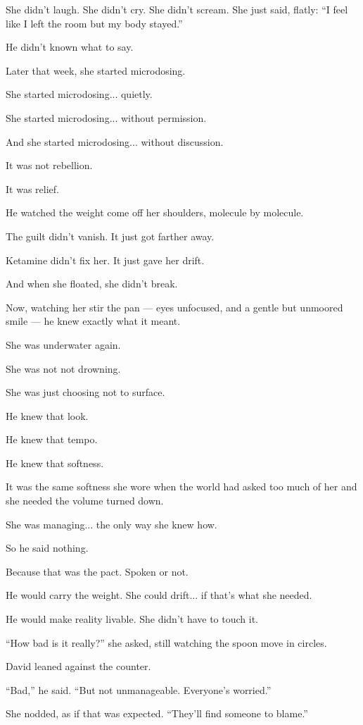 She didn't laugh. She didn’t cry. She didn’t scream. She just said, flatly:
``I feel like I left the room but my body stayed.''

He didn't known what to say.

Later that week, she started microdosing. 

She started microdosing... quietly. 

She started microdosing... without permission.

And she started microdosing... without discussion. 

It was not rebellion.

It was relief.

He watched the weight come off her shoulders, molecule by molecule.

The guilt didn’t vanish. It just got farther away.

Ketamine didn’t fix her. It just gave her drift.

And when she floated, she didn’t break.

Now, watching her stir the pan --- eyes unfocused, and a gentle but unmoored smile --- he knew exactly 
what it meant.

She was underwater again.

She was not not drowning.

She was just choosing not to surface.

He knew that look. 

He knew that tempo. 

He knew that softness.

It was the same softness she wore when the world had asked too much of her and she needed the volume 
turned down.

She was managing... the only way she knew how.

So he said nothing.

Because that was the pact.
Spoken or not.

He would carry the weight.
She could drift... if that’s what she needed.

He would make reality livable.
She didn’t have to touch it.

``How bad is it really?'' she asked, still watching the spoon move in circles.

David leaned against the counter.

``Bad,'' he said. ``But not unmanageable. Everyone’s worried.''

She nodded, as if that was expected. ``They’ll find someone to blame.''

